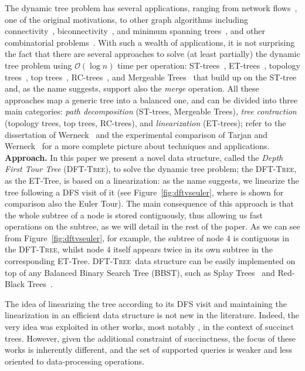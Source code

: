 \documentclass[a4paper,USenglish]{lipics}
\newcommand{\bigoh}{\mathcal{O}}
\newcommand{\dft}{\textsc{DFT-Tree}}
\newcommand{\runinsec}[1]{\noindent\textbf{\textsf{#1}}\quad}
\begin{document}
The dynamic tree problem has several applications, ranging from network flows~\cite{AMO93,GGT91,ST85,Tar97}, one of the original motivations, to other graph algorithms including connectivity~\cite{HK99}, biconnectivity~\cite{Fre83}, and minimum spanning trees~\cite{HK99,Fre85}, and other combinatorial problems~\cite{KMT03,Lan00}. 
With such a wealth of applications, it is not surprising the fact that there are several approaches to solve (at least partially) the dynamic tree problem using $\bigoh(\log n)$ time per operation: ST-trees~\cite{ST83,ST85}, ET-trees~\cite{HK99,Tar97}, topology trees~\cite{Fre85,Fre97a,Fre97b}, top trees~\cite{AHLT97,AHLT05,TW05}, RC-trees~\cite{ABV04,ABV05}, and Mergeable Trees~\cite{GKSTW11} that build up on the ST-tree and, as the name suggests, support also the \emph{merge} operation. All these approaches map a generic tree into a balanced one, and can be divided into three main categories: \emph{path decomposition} (ST-trees, Mergeable Trees), \emph{tree contraction} (topology trees, top trees, RC-trees), and \emph{linearization} (ET-trees);  refer to the dissertation of Werneck~\cite{Wer06} and the experimental comparison of Tarjan and Werneck~\cite{TW09} for a more complete picture about techniques and applications.
\\[4mm]
\runinsec{Approach.} In this paper we present a novel data structure, called the \emph{Depth First Tour Tree} (\dft), to solve the dynamic tree problem; the \dft, as the ET-Tree, is based on a linearization: as the name suggests, we linearize the tree following a DFS visit of it (see Figure~\ref{fig:dftvseuler}, where is shown for comparison also the Euler Tour). The main consequence of this approach is that the whole subtree of a node is stored contiguously, thus allowing us fast operations on the subtree, as we will detail in the rest of the paper.  As we can see from Figure~\ref{fig:dftvseuler}, for example, the subtree of node $4$ is contiguous in the \dft, whilst node $4$ itself appears twice in its own subtree in the corresponding ET-Tree. \dft\ data structure can be easily implemented on top of any Balanced Binary Search Tree (BBST), such as Splay Trees~\cite{ST85} and Red-Black Trees~\cite{CLRS09}. 

The idea of linearizing the tree according to its DFS visit and maintaining the linearization in an efficient data structure is not new in the literature. Indeed, the very idea was exploited in other works, most notably \cite{JR12,MR01,navarro2014fully}, in the context of succinct trees. However, given the additional constraint of succinctness, the focus of these works is inherently different, and the set of supported queries is weaker and less oriented to data-processing operations.
\end{document}
